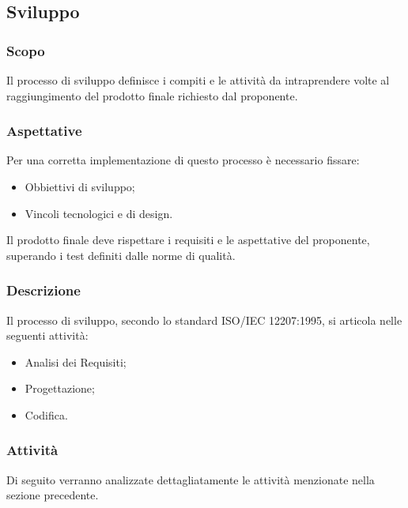 \subsection{Sviluppo}
		\subsubsection{Scopo}
			Il processo di sviluppo definisce i compiti e le attività da intraprendere volte al raggiungimento del prodotto finale richiesto dal proponente.
		\subsubsection{Aspettative}
			Per una corretta implementazione di questo processo è necessario fissare:
				\begin{itemize}
					\item Obbiettivi di sviluppo;
					\item Vincoli tecnologici e di design.
				\end{itemize}	
			Il prodotto finale deve rispettare i requisiti e le aspettative del proponente, superando i test definiti dalle norme di qualità.
		\subsubsection{Descrizione}
			Il processo di sviluppo, secondo lo standard ISO/IEC 12207:1995, si articola nelle seguenti attività:
				\begin{itemize}
					\item Analisi dei Requisiti;
					\item Progettazione;
					\item Codifica.
				\end{itemize}
		\subsubsection{Attività}
			Di seguito verranno analizzate dettagliatamente le attività menzionate nella sezione precedente.
